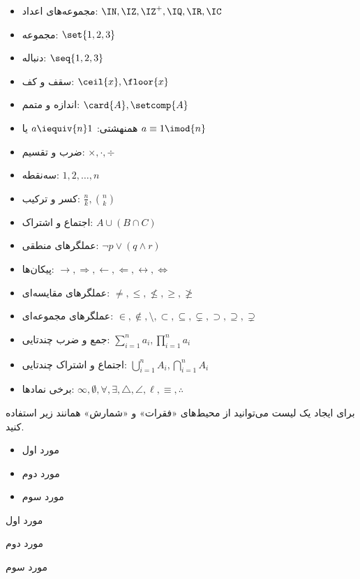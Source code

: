 \begin{itemize}
\item مجموعه‌های اعداد:
$\IN, \IZ, \IZ^+, \IQ, \IR, \IC$
\item مجموعه:
$\set{1, 2, 3}$
\item دنباله‌:
$\seq{1, 2, 3}$
\item سقف و کف:
$\ceil{x}, \floor{x}$
\item اندازه و متمم:
$\card{A}, \setcomp{A}$
\item همنهشتی:
$a \iequiv{n} 1$
یا
$a \equiv 1 \imod{n}$
\item ضرب و تقسیم:
$\times, \cdot, \div$
\item سه‌نقطه‌:
$1, 2, \dots, n$
\item کسر و ترکیب:
${\frac{n}{k}}, {n \choose k}$
\item اجتماع و اشتراک:
$A \cup (B \cap C)$
\item عملگرهای منطقی:
$\neg p \vee (q \wedge r)$

\item پیکان‌ها:
$\rightarrow, \Rightarrow, \leftarrow, \Leftarrow, \leftrightarrow, \Leftrightarrow$
\item عملگرهای مقایسه‌ای:
$\not=, \le, \not\le, \ge, \not\ge$
\item عملگرهای مجموعه‌ای:
$\in, \not\in, \setminus, \subset, \subseteq, \subsetneq, \supset, \supseteq, \supsetneq$

\item جمع و ضرب چندتایی:
$\sum_{i=1}^{n} a_i, \prod_{i=1}^{n} a_i$
\item اجتماع و اشتراک چندتایی:
$\bigcup_{i=1}^{n} A_i, \bigcap_{i=1}^{n} A_i$
\item برخی نمادها:
$\infty, \emptyset, \forall, \exists, \triangle, \angle, \ell, \equiv, \therefore$
\end{itemize}



برای ایجاد یک لیست‌ می‌توانید از محیط‌های «فقرات» و «شمارش» همانند زیر استفاده کنید.

\begin{multicols}{2}
\begin{itemize}
\item مورد اول
\item مورد دوم
\item مورد سوم
\end{itemize}

\begin{شمارش}
\item مورد اول
\item مورد دوم
\item مورد سوم
\end{شمارش}

\end{multicols}


